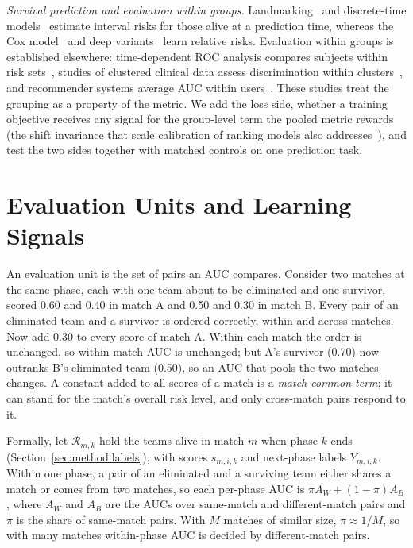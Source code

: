 \documentclass[sigconf,anonymous]{acmart}
\begin{document}
\emph{Survival prediction and evaluation within groups.} Landmarking~\cite{vanHouwelingen07} and discrete-time models~\cite{SingerWillett93,Gensheimer19} estimate interval risks for those alive at a prediction time, whereas the Cox model~\cite{Cox72} and deep variants~\cite{DeepHit18,DynamicDeepHit20} learn relative risks. Evaluation within groups is established elsewhere: time-dependent ROC analysis compares subjects within risk sets~\cite{HeagertyZheng05}, studies of clustered clinical data assess discrimination within clusters~\cite{vanKlaveren14}, and recommender systems average AUC within users~\cite{Zhou18}. These studies treat the grouping as a property of the metric. We add the loss side, whether a training objective receives any signal for the group-level term the pooled metric rewards (the shift invariance that scale calibration of ranking models also addresses~\cite{Yan22}), and test the two sides together with matched controls on one prediction task.

\section{Evaluation Units and Learning Signals}
\label{sec:account}
An evaluation unit is the set of pairs an AUC compares. Consider two matches at the same phase, each with one team about to be eliminated and one survivor, scored 0.60 and 0.40 in match A and 0.50 and 0.30 in match B. Every pair of an eliminated team and a survivor is ordered correctly, within and across matches. Now add 0.30 to every score of match A. Within each match the order is unchanged, so within-match AUC is unchanged; but A's survivor (0.70) now outranks B's eliminated team (0.50), so an AUC that pools the two matches changes. A constant added to all scores of a match is a \emph{match-common term}; it can stand for the match's overall risk level, and only cross-match pairs respond to it.

Formally, let $\mathcal{R}_{m,k}$ hold the teams alive in match $m$ when phase $k$ ends (Section~\ref{sec:method:labels}), with scores $s_{m,i,k}$ and next-phase labels $Y_{m,i,k}$. Within one phase, a pair of an eliminated and a surviving team either shares a match or comes from two matches, so each per-phase AUC is $\pi A_W+(1-\pi)A_B$, where $A_W$ and $A_B$ are the AUCs over same-match and different-match pairs and $\pi$ is the share of same-match pairs. With $M$ matches of similar size, $\pi\approx1/M$, so with many matches within-phase AUC is decided by different-match pairs.
\end{document}
